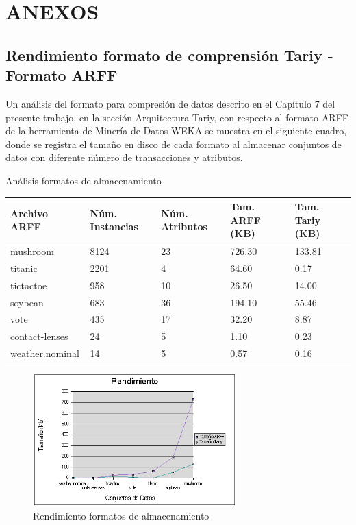 \appendix
\chapter{ANEXOS}
\section{Rendimiento formato de comprensi\'on Tariy - Formato ARFF}

Un an\'alisis del formato para compresi\'on de datos descrito en el Cap\'itulo 7 del presente trabajo, en la
secci\'on Arquitectura Tariy, con respecto al formato ARFF de la herramienta de Miner\'ia de Datos WEKA se
muestra en el siguiente cuadro, donde se registra el tama\~no en disco de cada formato al almacenar conjuntos de
datos con diferente n\'umero de transacciones y atributos.

\begin{table}[h]
\caption{An\'alisis formatos de almacenamiento}
\label{formatos}
\end{table}
\begin{center}
\begin{tabular}{|p{30mm}|p{20mm}|p{20mm}|p{20mm}|p{20mm}|} \hline
\textbf{Archivo ARFF}    & \textbf{N\'um. Instancias} & \textbf{N\'um. Atributos} & \textbf{Tam. ARFF (KB)} &
\textbf{Tam. Tariy (KB)}\\ \hline
mushroom        & 8124              & 23               & 726.30         & 133.81\\ \hline
titanic         & 2201              &  4               &  64.60         &   0.17\\ \hline
tictactoe       &  958              & 10               &  26.50         &  14.00\\ \hline
soybean         &  683              & 36               & 194.10         &  55.46\\ \hline
vote            &  435              & 17               &  32.20         &   8.87\\ \hline
contact-lenses  &   24              &  5               &   1.10         &   0.23\\ \hline
weather.nominal &   14              &  5               &   0.57         &   0.16\\ \hline
\end{tabular}
\end{center}

\begin{figure}[h]
\centering
\includegraphics[width=0.7\textwidth]{images/formatos.png}
\caption{Rendimiento formatos de almacenamiento}
\end{figure}

